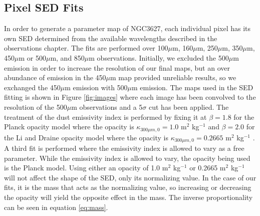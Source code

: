 \subsection{Pixel SED Fits}

In order to generate a parameter map of NGC3627, each individual pixel has its own SED determined from the available wavelengths described in the observations chapter.  The fits are performed over 100$\mu$m, 160$\mu$m, 250$\mu$m, 350$\mu$m, 450$\mu$m or 500$\mu$m, and 850$\mu$m observations.  Initially, we excluded the 500$\mu$m emission in order to increase the resolution of our final maps, but an over abundance of emission in the 450$\mu$m map provided unreliable results, so we exchanged the 450$\mu$m emission with 500$\mu$m emission.  The maps used in the SED fitting is shown in Figure \ref{fig:images} where each image has been convolved to the resolution of the 500$\mu$m observations and a 5$\sigma$ cut has been applied.  The treatment of the dust emissivity index is performed by fixing it at $\beta=1.8$ for the Planck opacity model where the opacity is $\kappa_{300\mu m,0}=1.0$ m$^2$ kg$^{-1}$ \citep{planckxxv2011} and $\beta=2.0$ for the Li and Draine opacity model where the opacity is $\kappa_{300\mu m,0}=0.2665$ m$^2$ kg$^{-1}$ \citep{li2001}.  A third fit is performed where the emissivity index is allowed to vary as a free parameter.  While the emissivity index is allowed to vary, the opacity being used is the Planck model.  Using either an opacity of 1.0 m$^2$ kg$^{-1}$ or 0.2665 m$^2$ kg$^{-1}$ will not affect the shape of the SED, only its normalizing value.  In the case of our fits, it is the mass that acts as the normalizing value, so increasing or decreasing the opacity will yield the opposite effect in the mass.  The inverse proportionality can be seen in equation \ref{eq:mass}.  

